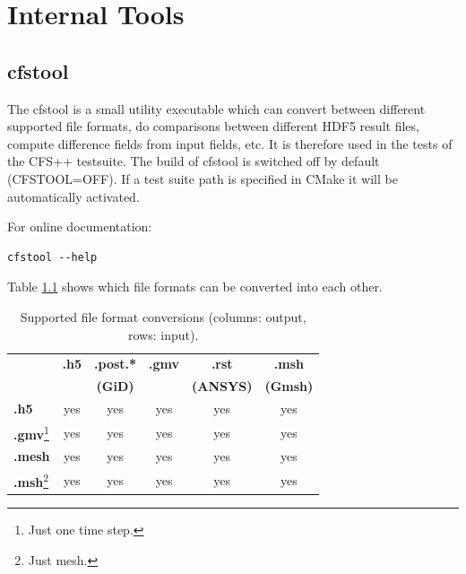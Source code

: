\chapter{Internal Tools}

\section{cfstool}
\label{sec:cfs_tool}

The cfstool is a small  utility executable which can convert between different
supported file  formats, do comparisons  between different HDF5  result files,
compute difference fields from input fields,  etc. It is therefore used in the
tests of the CFS++ testsuite. The  build of cfstool is switched off by default
(CFSTOOL=OFF).  If  a  test suite  path  is  specified  in  CMake it  will  be
automatically activated.

\noindent For online documentation:
\begin{verbatim}
cfstool --help
\end{verbatim}

\noindent Table \ref{tab:cfstool_conversions} shows  which file formats can be
converted into each other.

\begin{table}[htb]
\centering
\begin{minipage}{18cc}\caption{Supported file format conversions (columns: output, rows: input).}
\label{tab:cfstool_conversions}
\end{minipage}
\par\medskip\noindent
\begin{minipage}{18cc}
\centering
\begin{tabular}{lccccc}
  \toprule
            & {\bf .h5} & {\bf .post.* } & {\bf .gmv} & {\bf .rst}    & {\bf .msh}   \\ %
            &           & {\bf (GiD)}    &            & {\bf (ANSYS)} & {\bf (Gmsh)} \\ \otoprule %
  {\bf .h5} & yes & yes & yes & yes & yes \\
  {\bf .gmv}\footnote{Just one time step.} & yes & yes & yes & yes & yes  \\
  {\bf .mesh} & yes & yes & yes & yes & yes \\
  {\bf .msh}\footnote{Just mesh.} & yes & yes & yes & yes & yes \\
  \bottomrule
\end{tabular} 
\end{minipage}
\end{table}

